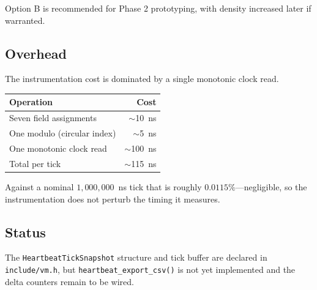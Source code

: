 Option B is recommended for Phase 2 prototyping, with density increased later if
warranted.

\subsection{Overhead}

The instrumentation cost is dominated by a single monotonic clock read.

\begin{tabular}{lr}
\toprule
Operation & Cost \\
\midrule
Seven field assignments & $\sim$10~ns \\
One modulo (circular index) & $\sim$5~ns \\
One monotonic clock read & $\sim$100~ns \\
\midrule
Total per tick & $\sim$115~ns \\
\bottomrule
\end{tabular}

\medskip
\noindent Against a nominal $1{,}000{,}000$~ns tick that is roughly
$0.0115\%$---negligible, so the instrumentation does not perturb the timing it
measures.

\subsection{Status}

The \lstinline{HeartbeatTickSnapshot} structure and tick buffer are declared in
\lstinline{include/vm.h}, but \lstinline{heartbeat_export_csv()} is not yet
implemented and the delta counters remain to be wired.

